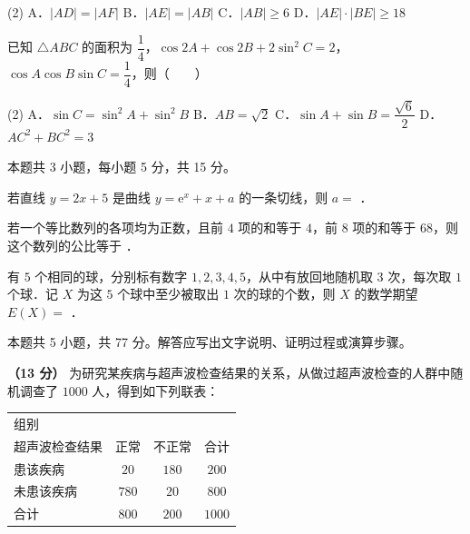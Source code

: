 \begin{gkopts}(2)
\task A．$|AD|=|AF|$
\task B．$|AE|=|AB|$
\task C．$|AB|\ge 6$
\task D．$|AE|\cdot|BE|\ge 18$
\end{gkopts}

已知 $\triangle ABC$ 的面积为 $\dfrac14$，$\cos 2A+\cos 2B+2\sin^2 C=2$，$\cos A\cos B\sin C=\dfrac14$，则（　　）

\begin{gkopts}(2)
\task A．$\sin C=\sin^2 A+\sin^2 B$
\task B．$AB=\sqrt2$
\task C．$\sin A+\sin B=\dfrac{\sqrt6}{2}$
\task D．$AC^2+BC^2=3$
\end{gkopts}

\par\medskip


\begin{gktip}
本题共 3 小题，每小题 5 分，共 15 分。
\end{gktip}

若直线 $y=2x+5$ 是曲线 $y=\mathrm{e}^{x}+x+a$ 的一条切线，则 $a=$ \gkblank{}．

若一个等比数列的各项均为正数，且前 $4$ 项的和等于 $4$，前 $8$ 项的和等于 $68$，则这个数列的公比等于 \gkblank{}．

有 $5$ 个相同的球，分别标有数字 $1,2,3,4,5$，从中有放回地随机取 $3$ 次，每次取 $1$ 个球．记 $X$ 为这 $5$ 个球中至少被取出 $1$ 次的球的个数，则 $X$ 的数学期望 $E(X)=$ \gkblank{}．

\par\medskip


\begin{gktip}
本题共 5 小题，共 77 分。解答应写出文字说明、证明过程或演算步骤。
\end{gktip}

\textbf{（13 分）} 为研究某疾病与超声波检查结果的关系，从做过超声波检查的人群中随机调查了 $1000$ 人，得到如下列联表：

\begin{center}
\begin{tabular}{lccc}
\toprule
组别 \\ 超声波检查结果 & 正常 & 不正常 & 合计 \\
\midrule
患该疾病 & $20$ & $180$ & $200$ \\
未患该疾病 & $780$ & $20$ & $800$ \\
合计 & $800$ & $200$ & $1000$ \\
\bottomrule
\end{tabular}
\end{center}

